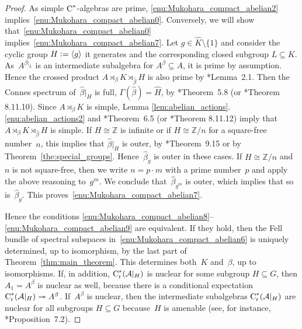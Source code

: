 \documentclass[a4paper]{amsart}
\theoremstyle{plain}
\theoremstyle{definition}
\theoremstyle{remark}
\numberwithin{theorem}{section}
\numberwithin{equation}{section}
\newcommand*{\nb}{\nobreakdash}
\newcommand*{\Z}{\mathbb Z}
\newcommand*{\red}{\mathrm{r}}%
\newcommand*{\Cst}{\textup C^*}%
\newcommand*{\A}{\mathcal A}%
\newcommand*{\defeq}{\mathrel{\vcentcolon=}}%
\newcommand*{\onto}{\twoheadrightarrow}
\begin{document}
\begin{proof}
  As simple \(\Cst\)\nb-algebras are prime,
  \ref{enu:Mukohara_compact_abelian2}
  implies~\ref{enu:Mukohara_compact_abelian0}.
  Conversely, we will show that~\ref{enu:Mukohara_compact_abelian0}
  implies~\ref{enu:Mukohara_compact_abelian7}.
  Let \(g\in \widehat{K}\setminus\{1\}\) and consider the cyclic group
  \(H\defeq \langle g\rangle\) it generates and the corresponding
  closed subgroup \(L\subseteq K\).
  As~\(A^{\beta|_L}\) is an intermediate subalgebra for
  \(A^\beta\subseteq A\), it is prime by assumption.
  Hence the crossed product \(A\rtimes_\beta K
  \rtimes_{\widehat{\beta}} H\) is also prime by
  \cite{Bratteli-Elliott-Evans-Kishimoto:Quasi-product}*{Lemma~2.1}.
  Then the Connes spectrum of~\(\widehat{\beta}|_H\) is full,
  \(\Gamma(\widehat{\beta})=\widehat{H}\), by
  \cite{Olesen-Pedersen:Applications_Connes}*{Theorem~5.8} (or
  \cite{Pedersen:Cstar_automorphisms_vol2}*{Theorem 8.11.10}).
  Since \(A\rtimes_\beta K\) is simple, Lemma
  \ref{lem:abelian_actions}.\ref{enu:abelian_actions2} and
  \cite{Olesen-Pedersen:Applications_Connes}*{Theorem~6.5}
  (or \cite{Pedersen:Cstar_automorphisms_vol2}*{Theorem 8.11.12})
  imply that \(A\rtimes_\beta K \rtimes_{\widehat{\beta}} H\) is
  simple.
  If \(H\cong \Z\) is infinite or if \(H\cong \Z/n\) for a square-free
  number~\(n\), this implies that \(\widehat{\beta}|_H\) is outer, by
  \cite{Kwasniewski-Meyer:Aperiodicity}*{Theorem~9.15} or by
  Theorem~\ref{the:special_groups}.
  Hence~\(\widehat{\beta}_g\) is outer in these cases.
  If \(H\cong \Z/n\) and~\(n\) is not square-free, then we write
  \(n=p\cdot m\) with a prime number~\(p\) and apply the above
  reasoning to~\(g^m\).
  We conclude that~\(\widehat{\beta}_{g^m}\) is outer, which implies
  that so is~\(\widehat{\beta}_g\).
  This proves~\ref{enu:Mukohara_compact_abelian7}.

  Hence the conditions
  \ref{enu:Mukohara_compact_abelian8}--\ref{enu:Mukohara_compact_abelian9}
  are equivalent.
  If they hold, then the Fell bundle of spectral subspaces
  in~\ref{enu:Mukohara_compact_abelian6} is uniquely determined, up to
  isomorphism, by the last part of Theorem~\ref{thm:main_theorem}.
  This determines both~\(K\) and~\(\beta\), up to isomorphisms.
  If, in addition, \(\Cst_\red(\A|_H)\) is nuclear for some subgroup
  \(H\subseteq G\), then \(A_1=A^\beta\) is nuclear as well, because
  there is a conditional expectation \(\Cst_\red(\A|_H)\onto
  A^\beta\).
  If~\(A^\beta\) is nuclear, then the intermediate subalgebras
  \(\Cst_\red(\A|_H)\) are nuclear for all subgroups \(H\subseteq G\)
  because~\(H\) is amenable (see, for instance,
  \cite{Abadie-Buss-Ferraro:Amenability}*{Proposition~7.2}).
\end{proof}
\end{document}
